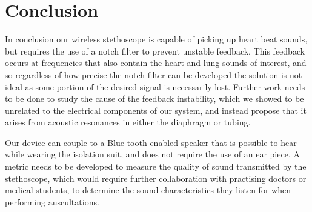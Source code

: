 \chapter{Conclusion} \label{conclusion}

In conclusion our wireless stethoscope is capable of picking up heart beat sounds, but requires the use of a notch filter to prevent unstable feedback. This feedback occurs at frequencies that also contain the heart and lung sounds of interest, and so regardless of how precise the notch filter can be developed the solution is not ideal as some portion of the desired signal is necessarily lost. Further work needs to be done to study the cause of the feedback instability, which we showed to be unrelated to the electrical components of our system, and instead propose that it arises from acoustic resonances in either the diaphragm or tubing. 

Our device can couple to a Blue tooth enabled speaker that is possible to hear while wearing the isolation suit, and does not require the use of an ear piece. A metric needs to be developed to measure the quality of sound transmitted by the stethoscope, which would require further collaboration with practising doctors or medical students, to determine the sound characteristics they listen for when performing auscultations.